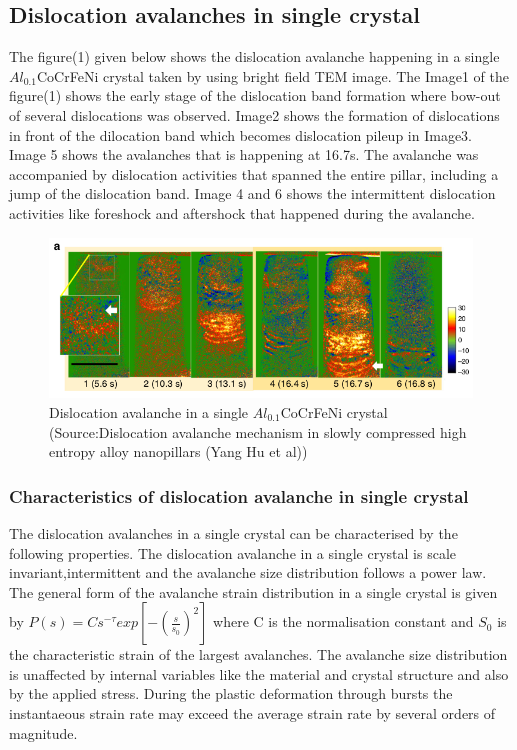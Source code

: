 \documentclass[a4paper,12pt]{article}
\begin{document}
\subsection{Dislocation avalanches in single crystal}
\indent\indent The figure(1) given below shows the dislocation avalanche happening in a single $ Al_{0.1}$CoCrFeNi crystal taken by using bright field TEM image. The Image1 of the figure(1) shows the early stage of the dislocation band formation where bow-out of several dislocations was observed. Image2 shows the formation of dislocations in front of the dilocation band which becomes dislocation pileup in Image3. Image 5 shows the avalanches that is happening at 16.7s. The avalanche was accompanied by dislocation activities that spanned the entire pillar, including a jump of the dislocation band. Image 4 and 6 shows the intermittent dislocation activities like foreshock and aftershock that happened during the avalanche.
\begin{figure}[htbp]
  \centering
  \includegraphics[width=1\textwidth]{./avalanche.png}
  \caption{Dislocation avalanche in a single  $ Al_{0.1}$CoCrFeNi crystal  (Source:Dislocation avalanche mechanism in slowly compressed high entropy alloy nanopillars (Yang Hu et al))}
\end{figure}
\subsubsection{Characteristics of dislocation avalanche in single crystal}
The dislocation avalanches in a single crystal can be characterised by the following properties. The dislocation avalanche in a single crystal is scale invariant,intermittent and the avalanche size distribution follows a power law. The general form of the avalanche strain distribution in a single crystal is given by $ P(s) = Cs^{-\tau} exp[-(\frac{s}{s_0})^2] $ where C is the normalisation constant and $S_0$ is the characteristic strain of the largest avalanches. The avalanche size distribution is unaffected by internal variables like the material and crystal structure and also by the applied stress. During the plastic deformation through bursts the instantaeous strain rate may exceed the average strain rate by several orders of magnitude.
\end{document}
